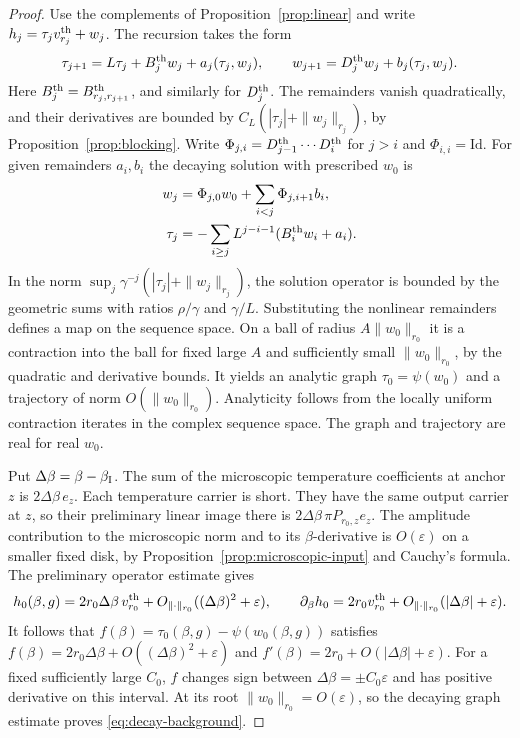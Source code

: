 \documentclass[11pt]{article}
\theoremstyle{definition}
\begin{document}
\begin{proof}
Use the complements of Proposition~\ref{prop:linear} and write
\(h_j=\tau_jv_{r_j}^{\rm th}+w_j\). The recursion takes the form
\[
 \tau_{j+1}=L\tau_j+B_j^{\rm th}w_j+a_j(\tau_j,w_j),\qquad
 w_{j+1}=D_j^{\rm th}w_j+b_j(\tau_j,w_j).
\]
Here \(B_j^{\rm th}=B^{\rm th}_{r_j,r_{j+1}}\), and similarly for
\(D_j^{\rm th}\). The remainders vanish quadratically, and their
derivatives are bounded by \(C_L(|\tau_j|+\|w_j\|_{r_j})\), by
Proposition~\ref{prop:blocking}. Write
\(\Phi_{j,i}=D^{\rm th}_{j-1}\cdots D^{\rm th}_i\) for \(j>i\) and
\(\Phi_{i,i}=\mathrm{Id}\).
For given remainders \(a_i,b_i\) the decaying solution with prescribed
\(w_0\) is
\begin{align*}
 w_j&=\Phi_{j,0}w_0+\sum_{i<j}\Phi_{j,i+1}b_i,\\
 \tau_j&=-\sum_{i\ge j} L^{j-i-1}(B_i^{\rm th}w_i+a_i).
\end{align*}
In the norm \(\sup_j\gamma^{-j}(|\tau_j|+\|w_j\|_{r_j})\),
the solution operator is bounded by the geometric sums with ratios
\(\rho/\gamma\) and \(\gamma/L\). Substituting the nonlinear
remainders defines a map on the sequence space. On a ball of radius
\(A\|w_0\|_{r_0}\) it is a contraction into the ball for fixed
large \(A\) and sufficiently small \(\|w_0\|_{r_0}\), by the
quadratic and derivative bounds. It yields an analytic graph
\(\tau_0=\psi(w_0)\) and a trajectory of norm \(O(\|w_0\|_{r_0})\).
Analyticity follows from the locally uniform contraction iterates in
the complex sequence space. The graph and trajectory are real for
real \(w_0\).

Put \(\Delta\beta=\beta-\beta_{\rm I}\). The sum of the microscopic
temperature coefficients at anchor \(z\) is \(2\Delta\beta\,e_z\).
Each temperature carrier is short. They have the same output
carrier at \(z\), so their preliminary linear image there is
\(2\Delta\beta\,\pi P_{r_0,z}e_z\).
The amplitude contribution to the microscopic norm and to its
\(\beta\)-derivative is \(O(\varepsilon)\) on a smaller fixed disk,
by Proposition~\ref{prop:microscopic-input} and Cauchy's formula.
The preliminary operator estimate gives
\[
 h_0(\beta,g)=2r_0\Delta\beta\,v_{r_0}^{\rm th}
       +O_{\|\cdot\|_{r_0}}((\Delta\beta)^2+\varepsilon),\qquad
 \partial_\beta h_0=2r_0 v_{r_0}^{\rm th}
       +O_{\|\cdot\|_{r_0}}(|\Delta\beta|+\varepsilon).
\]
It follows that \(f(\beta)=\tau_0(\beta,g)-\psi(w_0(\beta,g))\)
satisfies \(f(\beta)=2r_0\Delta\beta+O((\Delta\beta)^2+\varepsilon)\) and
\(f'(\beta)=2r_0+O(|\Delta\beta|+\varepsilon)\). For a fixed sufficiently
large \(C_0\), \(f\) changes sign between \(\Delta\beta=\pm C_0\varepsilon\)
and has positive derivative on this interval. At its root
\(\|w_0\|_{r_0}=O(\varepsilon)\), so the decaying graph estimate
proves \eqref{eq:decay-background}.
\end{proof}
\end{document}
